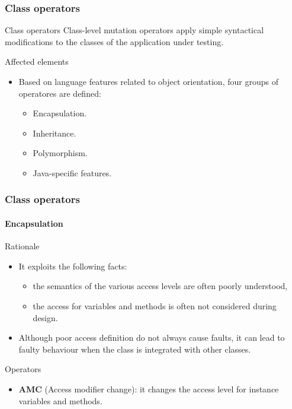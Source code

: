 \begin{frame}[parent={concept:mujava}, hasprev=false, hasnext=true]
\frametitle{Class operators}

\begin{block:concept}{Class operators}
Class-level mutation operators apply simple syntactical modifications to the
classes of the application under testing.
\end{block:concept}

\begin{block:fact}{Affected elements}
\begin{itemize}
	\item Based on language features related to object orientation, four
	groups of operatores are defined:
	\begin{itemize}
		\item Encapsulation.
		\item Inheritance.
		\item Polymorphism.
		\item Java-specific features.
	\end{itemize}
\end{itemize}
\end{block:fact}
\end{frame}



\begin{frame}[hasprev=true, hasnext=true]
\frametitle{Class operators}
\framesubtitle{Encapsulation}


\begin{block:fact}{Rationale}
\begin{itemize}
	\item It exploits the following facts:
	\begin{itemize}
		\item the semantics of the various access levels are often poorly
		understood,

		\item the access for variables and methods is often not considered
		during design.
	\end{itemize}

	\item Although poor access definition do not always cause faults, it can
	lead to faulty behaviour when the class is integrated with other classes.
\end{itemize}
\end{block:fact}

\begin{block:fact}{Operators}
\begin{itemize}
	\item \textbf{AMC} (Access modifier change): it changes the access level
	for instance variables and methods.
\end{itemize}
\end{block:fact}
\end{frame}


